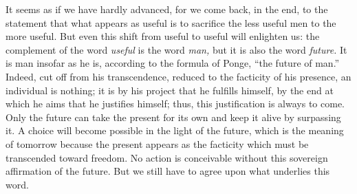 \documentclass[11pt]{article}
\begin{document}
{{It seems as if we have hardly advanced, for we come back, in the end, to the statement that what appears as useful is to sacrifice the less useful men to the more useful. But even this shift from useful to useful will enlighten us: the complement of the word \textit{useful} is the word \textit{man, }but it is also the word \textit{future. }It is man insofar as he is, according to the formula of Ponge, “the future of man.” Indeed, cut off from his transcendence, reduced to the facticity of his presence, an individual is nothing; it is by his project that he fulfills himself, by the end at which he aims that he justifies himself; thus, this justification is always to come. Only the future can take the present for its own and keep it alive by surpassing it. A choice will become possible in the light of the future, which is the meaning of tomorrow because the present appears as the facticity which must be transcended toward freedom. No action is conceivable without this sovereign affirmation of the future. But we still have to agree upon what underlies this word.
}}
\end{document}
